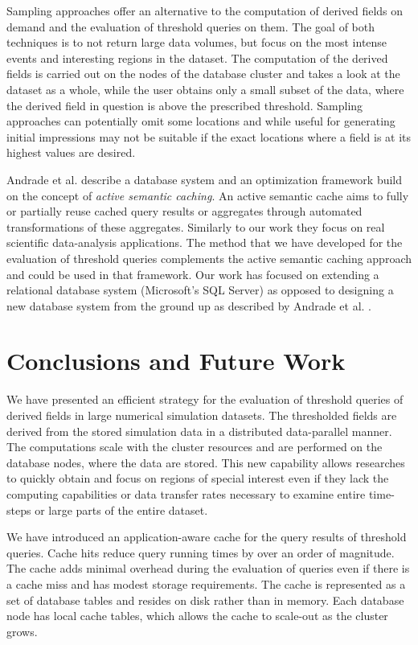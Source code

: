 \documentclass{sig-alternate}
\begin{document}
Sampling approaches \cite{Sidirourgos, Nirkhiwale} offer an alternative to the computation of derived fields on demand and the evaluation of threshold queries
on them. The goal of both techniques is to not return large data volumes, but focus on the most intense events and interesting regions in the dataset. 
The computation of the derived fields is carried out on the nodes of the database cluster and takes a look at the dataset as a whole, while the user obtains only
a small subset of the data, where the derived field in question is above the prescribed threshold. Sampling approaches can potentially omit some locations and
while useful for generating initial impressions may not be suitable if the exact locations where a field is at its highest values are desired.

Andrade et al. \cite{Andrade} describe a database system and an optimization framework build on the concept of \emph{active semantic caching}. An
active semantic cache aims to fully or partially reuse cached query results or aggregates through automated transformations of these aggregates. Similarly
to our work they focus on real scientific data-analysis applications. The method that we have developed for the evaluation of threshold queries complements
the active semantic caching approach and could be used in that framework. Our work has focused on extending a relational database system (Microsoft's SQL
Server) as opposed to designing a new database system from the ground up as described by Andrade et al. \cite{Andrade}.

\section{Conclusions and Future Work}

We have presented an efficient strategy for the evaluation of threshold queries of derived fields in large numerical simulation datasets. 
The thresholded fields are derived from the stored simulation data in a distributed data-parallel manner. The computations
scale with the cluster resources and are performed on the database nodes, where the data are stored. This new capability allows researches to quickly
obtain and focus on regions of special interest even if they lack the computing capabilities or data transfer rates necessary to examine entire time-steps
or large parts of the entire dataset. 

We have introduced an application-aware cache for the query results of threshold queries. Cache hits reduce query running times by over an order of
magnitude. The cache adds minimal overhead during the evaluation of queries even if there is
a cache miss and has modest storage requirements. The cache is represented as a set of database tables and resides on disk rather than in memory. 
Each database node has local cache tables, which allows the cache to scale-out as the cluster grows.
\end{document}
